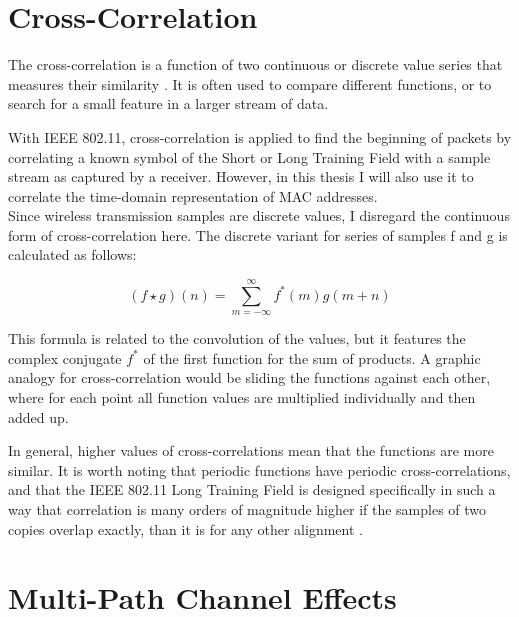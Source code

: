 
\section{Cross-Correlation}

The cross-correlation is a function of two continuous or discrete value series that measures their similarity \cite{rabiner1978}. It is often used to compare different functions, or to search for a small feature in a larger stream of data.

With \gls{IEEE} 802.11, cross-correlation is applied to find the beginning of packets by correlating a known symbol of the Short or Long Training Field with a sample stream as captured by a receiver. However, in this thesis I will also use it to correlate the time-domain representation of \gls{MAC} addresses.\\

Since wireless transmission samples are discrete values, I disregard the continuous form of cross-correlation here. The discrete variant for series of samples f and g is calculated as follows:

$$ (f \star g)(n) = \sum_{m=-\infty}^{\infty} f^{\ast}(m) g(m+n) $$\vspace{0cm}

This formula is related to the convolution of the values, but it features the complex conjugate $ f^{\ast} $ of the first function for the sum of products. A graphic analogy for cross-correlation would be sliding the functions against each other, where for each point all function values are multiplied individually and then added up.

In general, higher values of cross-correlations mean that the functions are more similar. It is worth noting that periodic functions have periodic cross-correlations, and that the \gls{IEEE} 802.11 Long Training Field is designed specifically in such a way that correlation is many orders of magnitude higher if the samples of two copies overlap exactly, than it is for any other alignment \cite{perahia2013}.



\section{Multi-Path Channel Effects}\label{sec:multipath}

